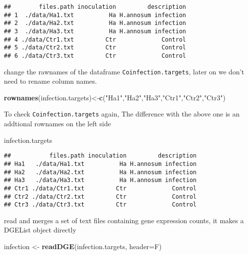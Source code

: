 \documentclass[
]{article}
\newenvironment{Shaded}{\begin{snugshade}}{\end{snugshade}}
\newcommand{\AttributeTok}[1]{\textcolor[rgb]{0.13,0.29,0.53}{#1}}
\newcommand{\FunctionTok}[1]{\textcolor[rgb]{0.13,0.29,0.53}{\textbf{#1}}}
\newcommand{\NormalTok}[1]{#1}
\newcommand{\OtherTok}[1]{\textcolor[rgb]{0.56,0.35,0.01}{#1}}
\newcommand{\StringTok}[1]{\textcolor[rgb]{0.31,0.60,0.02}{#1}}
\begin{document}
\begin{verbatim}
##        files.path inoculation         description
## 1  ./data/Ha1.txt          Ha H.annosum infection
## 2  ./data/Ha2.txt          Ha H.annosum infection
## 3  ./data/Ha3.txt          Ha H.annosum infection
## 4 ./data/Ctr1.txt         Ctr             Control
## 5 ./data/Ctr2.txt         Ctr             Control
## 6 ./data/Ctr3.txt         Ctr             Control
\end{verbatim}

change the rawnames of the dataframe \texttt{Coinfection.targets}, later
on we don't need to rename column names.

\begin{Shaded}
\begin{Highlighting}[]
\FunctionTok{rownames}\NormalTok{(infection.targets)}\OtherTok{\textless{}{-}}\FunctionTok{c}\NormalTok{(}\StringTok{"Ha1"}\NormalTok{,}\StringTok{"Ha2"}\NormalTok{,}\StringTok{"Ha3"}\NormalTok{,}\StringTok{"Ctr1"}\NormalTok{,}\StringTok{"Ctr2"}\NormalTok{,}\StringTok{"Ctr3"}\NormalTok{)}
\end{Highlighting}
\end{Shaded}

To check \texttt{Coinfection.targets} again, The difference with the
above one is an addtional rownames on the left side

\begin{Shaded}
\begin{Highlighting}[]
\NormalTok{infection.targets}
\end{Highlighting}
\end{Shaded}

\begin{verbatim}
##           files.path inoculation         description
## Ha1   ./data/Ha1.txt          Ha H.annosum infection
## Ha2   ./data/Ha2.txt          Ha H.annosum infection
## Ha3   ./data/Ha3.txt          Ha H.annosum infection
## Ctr1 ./data/Ctr1.txt         Ctr             Control
## Ctr2 ./data/Ctr2.txt         Ctr             Control
## Ctr3 ./data/Ctr3.txt         Ctr             Control
\end{verbatim}

read and merges a set of text files containing gene expression counts,
it makes a DGEList object directly

\begin{Shaded}
\begin{Highlighting}[]
\NormalTok{infection }\OtherTok{\textless{}{-}} \FunctionTok{readDGE}\NormalTok{(infection.targets, }\AttributeTok{header=}\NormalTok{F)}
\end{Highlighting}
\end{Shaded}
\end{document}
